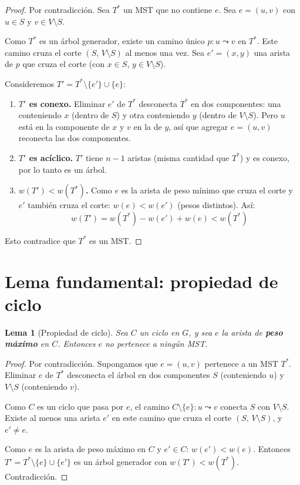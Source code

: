 \documentclass[11pt, letterpaper]{article}
\theoremstyle{definition}
\theoremstyle{plain}
\newtheorem{lemma}[theorem]{Lema}
\theoremstyle{remark}
\begin{document}
\begin{proof}
Por contradicción. Sea $T^*$ un MST que no contiene $e$. Sea
$e = (u, v)$ con $u \in S$ y $v \in V \setminus S$.

Como $T^*$ es un árbol generador, existe un camino único
$p: u \leadsto v$ en $T^*$. Este camino cruza el corte
$(S,\, V \setminus S)$ al menos una vez. Sea $e' = (x, y)$ una
arista de $p$ que cruza el corte (con $x \in S$,
$y \in V \setminus S$).

Consideremos $T' = T^* \setminus \{e'\} \cup \{e\}$:

\begin{enumerate}
  \item \textbf{$T'$ es conexo.} Eliminar $e'$ de $T^*$ desconecta
    $T^*$ en dos componentes: una conteniendo $x$ (dentro de $S$) y
    otra conteniendo $y$ (dentro de $V \setminus S$). Pero $u$ está
    en la componente de $x$ y $v$ en la de $y$, así que agregar
    $e = (u,v)$ reconecta las dos componentes.

  \item \textbf{$T'$ es acíclico.} $T'$ tiene $n - 1$ aristas
    (misma cantidad que $T^*$) y es conexo, por lo tanto es un
    árbol.

  \item \textbf{$w(T') < w(T^*)$.} Como $e$ es la arista de peso
    mínimo que cruza el corte y $e'$ también cruza el corte:
    $w(e) < w(e')$ (pesos distintos). Así:
    \[
      w(T') = w(T^*) - w(e') + w(e) < w(T^*)
    \]
\end{enumerate}

Esto contradice que $T^*$ es un MST.
\end{proof}

\section{Lema fundamental: propiedad de ciclo}

\begin{lemma}[Propiedad de ciclo]\label{lem:cycle}
Sea $C$ un ciclo en $G$, y sea $e$ la arista de \textbf{peso máximo}
en $C$. Entonces $e$ no pertenece a ningún MST.
\end{lemma}

\begin{proof}
Por contradicción. Supongamos que $e = (u, v)$ pertenece a un MST
$T^*$. Eliminar $e$ de $T^*$ desconecta el árbol en dos componentes
$S$ (conteniendo $u$) y $V \setminus S$ (conteniendo $v$).

Como $C$ es un ciclo que pasa por $e$, el camino
$C \setminus \{e\}: u \leadsto v$ conecta $S$ con
$V \setminus S$. Existe al menos una arista $e'$ en este camino que
cruza el corte $(S,\, V \setminus S)$, y $e' \neq e$.

Como $e$ es la arista de peso máximo en $C$ y $e' \in C$:
$w(e') < w(e)$. Entonces
$T' = T^* \setminus \{e\} \cup \{e'\}$ es un árbol generador con
$w(T') < w(T^*)$. Contradicción.
\end{proof}
\end{document}
